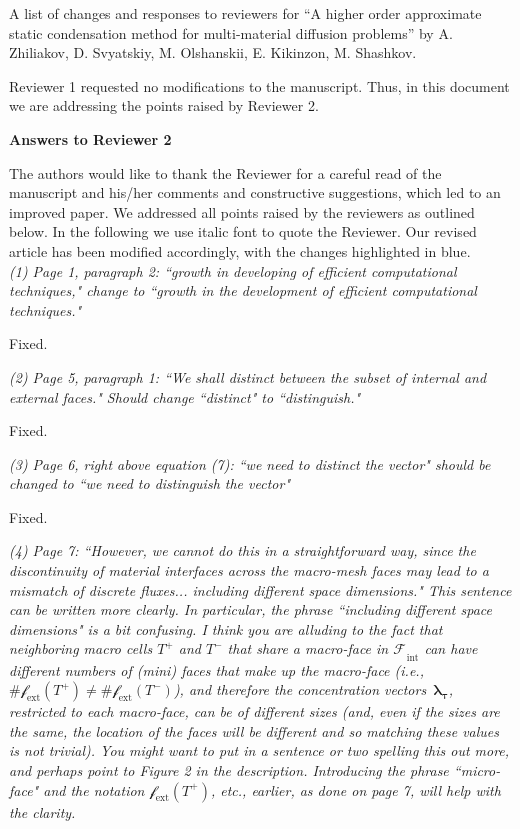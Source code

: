\documentclass[12pt]{article}
\newcommand{\vect}[1]{\boldsymbol{\mathbf{#1}}}
\newcommand{\mfaces}[1][]{{\vect{\mathcal f}_{\text{#1}}}}
\newcommand{\bfaces}[1][]{{\vect{\mathcal F}_{\text{#1}}}}
\begin{document}
\begin{center}A list of changes  and responses to reviewers for ``A higher order approximate static condensation method for multi-material diffusion problems'' by A. Zhiliakov, D. Svyatskiy, M. Olshanskii, E. Kikinzon, M. Shashkov.
\end{center}
\bigskip




Reviewer 1 requested no modifications to the manuscript. Thus, in this document we are  addressing the points raised by Reviewer 2.

\textbf{Answers to Reviewer 2}

The authors would like to thank the Reviewer for a careful read of the manuscript and his/her comments and
constructive suggestions, which led to an improved paper. We addressed all points raised by the reviewers as outlined below.
In the following
we use italic font to quote the Reviewer.
Our revised article has been modified accordingly, with the changes {highlighted in blue}.\\


\emph{(1) Page 1, paragraph 2: ``growth in developing of efficient computational techniques," change to ``growth in the development of efficient computational techniques."}

Fixed.

\emph{(2) Page 5, paragraph 1: ``We shall distinct between the subset of internal and external faces." Should change ``distinct" to ``distinguish."}

Fixed.

\emph{(3) Page 6, right above equation (7): ``we need to distinct the vector" should be changed to ``we need to distinguish the vector"}

Fixed.

\emph{(4) Page 7: ``However, we cannot do this in a straightforward way, since the discontinuity of material interfaces across the macro-mesh faces may lead to a mismatch of discrete fluxes... including different space dimensions." This sentence can be written more clearly. In particular, the phrase ``including different space dimensions" is a bit confusing. I think you are alluding to the fact that neighboring macro cells $T^{+}$ and $T^{-}$ that share a macro-face in $\bfaces_{\text{int}}$ can have different numbers of (mini) faces that make up the macro-face (i.e., $\#\mfaces[ext](T^+) \neq \#\mfaces[ext](T^-)$), and therefore the concentration vectors~$\vect \lambda_{\boldsymbol{\tau}}$, restricted to each macro-face, can be of different sizes (and, even if the sizes are the same, the location of the faces will be different and so matching these values is not trivial). You might want to put in a sentence or two spelling this out more, and perhaps point to Figure 2 in the description. Introducing the phrase ``micro-face" and the notation $\mfaces[ext](T^+)$, etc., earlier, as done on page 7, will help with the clarity.}
\end{document}
